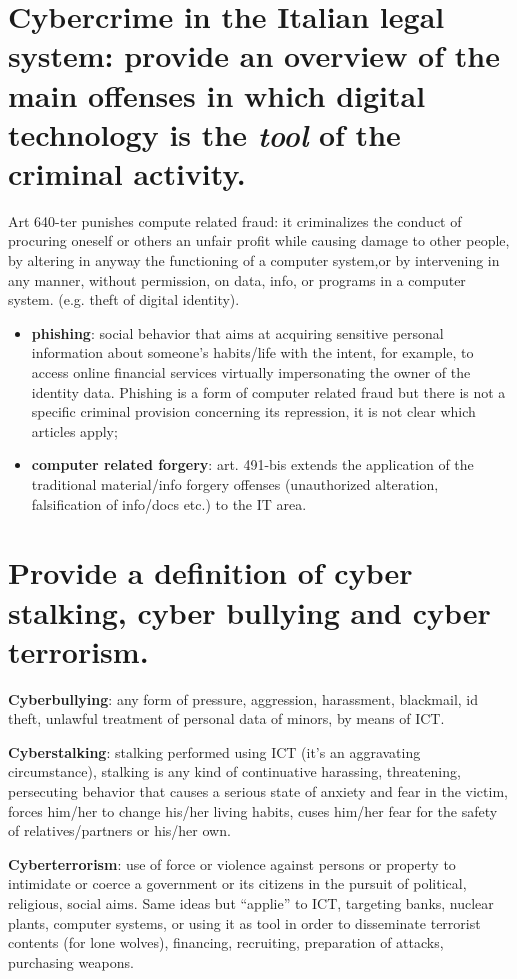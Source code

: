 \documentclass[a4paper, 11pt]{article}
\begin{document}
\section{Cybercrime in the Italian legal system: provide an overview of the main offenses in which digital technology is the \textit{tool} of the criminal activity.}
Art 640-ter punishes compute related fraud: it criminalizes the conduct of procuring oneself or others an unfair profit while causing damage to other people, by altering in anyway the functioning of a computer system,or by intervening in any manner, without permission, on data, info, or programs in a computer system. (e.g. theft of digital identity).
\begin{itemize}
\item \textbf{phishing}: social behavior that aims at acquiring sensitive personal information about someone's habits/life with the intent, for example, to access online financial services virtually impersonating the owner of the identity data. Phishing is a form of computer related fraud but there is not a specific criminal provision concerning its repression, it is not clear which articles apply;
\item \textbf{computer related forgery}: art. 491-bis extends the application of the traditional material/info forgery offenses (unauthorized alteration, falsification of info/docs etc.) to the IT area.
\end{itemize}

\section{Provide a definition of cyber stalking, cyber bullying and cyber terrorism.}
\textbf{Cyberbullying}: any form of pressure, aggression, harassment, blackmail, id theft, unlawful treatment of personal data of minors, by means of ICT.

\textbf{Cyberstalking}: stalking performed using ICT (it's an aggravating circumstance), stalking is any kind of continuative harassing, threatening, persecuting behavior that causes a serious state of anxiety and fear in the victim, forces him/her to change his/her living habits, cuses him/her fear for the safety of relatives/partners or his/her own.

\textbf{Cyberterrorism}: use of force or violence against persons or property to intimidate or coerce a government or its citizens in the pursuit of political, religious, social aims. Same ideas but ``applie'' to ICT, targeting banks, nuclear plants, computer systems, or using it as tool in order to disseminate terrorist contents (for lone wolves), financing, recruiting, preparation of attacks, purchasing weapons.
\end{document}
